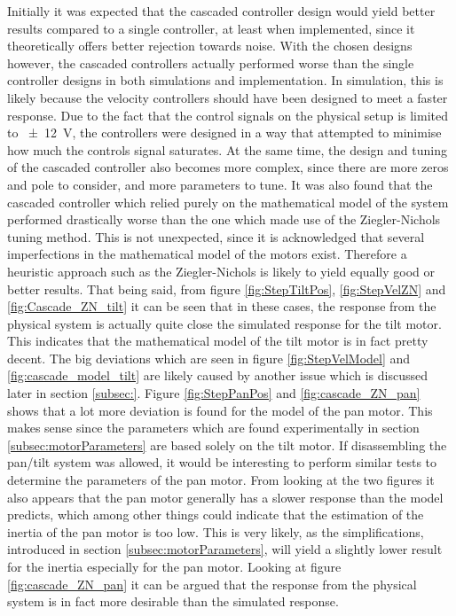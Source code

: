 \documentclass[../../main.tex]{subfiles}
\begin{document}
Initially it was expected that the cascaded controller design would yield better results compared to a single controller, at least when implemented, since it theoretically offers better rejection towards noise. With the chosen designs however, the cascaded controllers actually performed worse than the single controller designs in both simulations and implementation. In simulation, this is likely because the velocity controllers should have been designed to meet a faster response. Due to the fact that the control signals on the physical setup is limited to \SI{\pm 12}{\volt}, the controllers were designed in a way that attempted to minimise how much the controls signal saturates. At the same time, the design and tuning of the cascaded controller also becomes more complex, since there are more zeros and pole to consider, and more parameters to tune. 
It was also found that the cascaded controller which relied purely on the mathematical model of the system performed drastically worse than the one which made use of the Ziegler-Nichols tuning method. This is not unexpected, since it is acknowledged that several imperfections in the mathematical model of the motors exist. Therefore a heuristic approach such as the Ziegler-Nichols is likely to yield equally good or better results. That being said, from figure \ref{fig:StepTiltPos}, \ref{fig:StepVelZN} and \ref{fig:Cascade_ZN_tilt} it can be seen that in these cases, the response from the physical system is actually quite close the simulated response for the tilt motor. This indicates that the mathematical model of the tilt motor is in fact pretty decent. The big deviations which are seen in figure \ref{fig:StepVelModel} and \ref{fig:cascade_model_tilt} are likely caused by another issue which is discussed later in section \ref{subsec:}. Figure \ref{fig:StepPanPos} and \ref{fig:cascade_ZN_pan} shows that a lot more deviation is found for the model of the pan motor. This makes sense since the parameters which are found experimentally in section \ref{subsec:motorParameters} are based solely on the tilt motor. If disassembling the pan/tilt system was allowed, it would be interesting to perform similar tests to determine the parameters of the pan motor. From looking at the two figures it also appears that the pan motor generally has a slower response than the model predicts, which among other things could indicate that the estimation of the inertia of the pan motor is too low. This is very likely, as the simplifications, introduced in section \ref{subsec:motorParameters}, will yield a slightly lower result for the inertia especially for the pan motor.  Looking at figure \ref{fig:cascade_ZN_pan} it can be argued that the response from the physical system is in fact more desirable than the simulated response.
\end{document}

